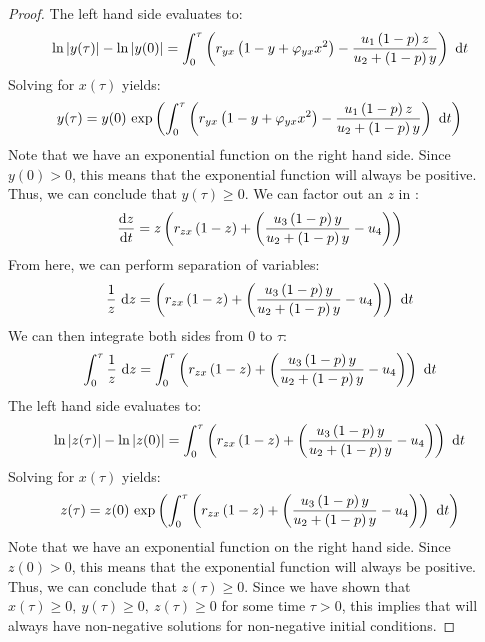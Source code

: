 \begin{proof}
    The left hand side evaluates to:
    \begin{equation*}
        \ln{y(\tau)}-\ln{y(0)} = \int_0^\tau \left(r_{yx}\left(1-y+\varphi_{yx}x^2\right)-\frac{u_1\left(1-p\right)z}{u_2+\left(1-p\right)y}\right)\ \opdiff{t}
    \end{equation*}
    Solving for $x(\tau)$ yields:
    \begin{equation*}
        y(\tau) = y(0)\ \exp{\int_0^\tau \left(r_{yx}\left(1-y+\varphi_{yx}x^2\right)-\frac{u_1\left(1-p\right)z}{u_2+\left(1-p\right)y}\right)\ \opdiff{t}}
    \end{equation*}
    Note that we have an exponential function on the right hand side. Since $y(0) > 0$, this means that the exponential function will always be positive. Thus, we can conclude that $y(\tau) \geq 0$. We can factor out an $z$ in :
    \begin{equation*}
        \diff[]{z}{t} = z\left(r_{zx}\left(1-z\right)+\left(\frac{u_3\left(1-p\right)y}{u_2+\left(1-p\right)y}-u_4\right)\right)
    \end{equation*}
    From here, we can perform separation of variables:
    \begin{equation*}
        \frac{1}{z}\ \opdiff{z} = \left(r_{zx}\left(1-z\right)+\left(\frac{u_3\left(1-p\right)y}{u_2+\left(1-p\right)y}-u_4\right)\right)\ \opdiff{t}
    \end{equation*}
    We can then integrate both sides from 0 to $\tau$:
    \begin{equation*}
        \int_0^\tau \frac{1}{z}\ \opdiff{z} = \int_0^\tau \left(r_{zx}\left(1-z\right)+\left(\frac{u_3\left(1-p\right)y}{u_2+\left(1-p\right)y}-u_4\right)\right)\ \opdiff{t}
    \end{equation*}
    The left hand side evaluates to:
    \begin{equation*}
        \ln{z(\tau)}-\ln{z(0)} = \int_0^\tau \left(r_{zx}\left(1-z\right)+\left(\frac{u_3\left(1-p\right)y}{u_2+\left(1-p\right)y}-u_4\right)\right)\ \opdiff{t}
    \end{equation*}
    Solving for $x(\tau)$ yields:
    \begin{equation*}
        z(\tau) = z(0)\ \exp{\int_0^\tau \left(r_{zx}\left(1-z\right)+\left(\frac{u_3\left(1-p\right)y}{u_2+\left(1-p\right)y}-u_4\right)\right)\ \opdiff{t}}
    \end{equation*}
    Note that we have an exponential function on the right hand side. Since $z(0) > 0$, this means that the exponential function will always be positive. Thus, we can conclude that $z(\tau) \geq 0$. Since we have shown that $x(\tau) \geq 0,\ y(\tau) \geq 0,\ z(\tau) \geq 0$ for some time $\tau > 0$, this implies that  will always have non-negative solutions for non-negative initial conditions.
\end{proof}

